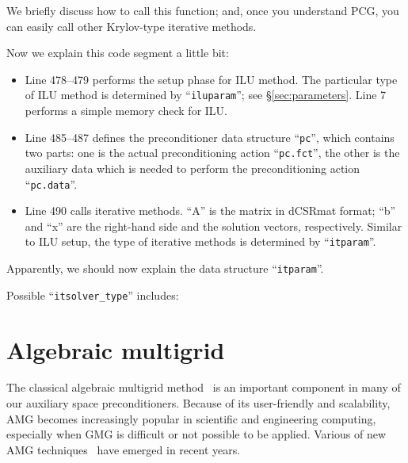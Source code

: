 \documentclass[11pt]{memoir}
\begin{document}
We briefly discuss how to call this function; and, once you understand PCG, you can easily call other Krylov-type iterative methods.
%

%
Now we explain this code segment a little bit:
\begin{itemize}
\item Line 478--479 performs the setup phase for ILU method. The particular type of ILU method is determined by ``\verb|iluparam|''; see \S\ref{sec:parameters}. Line 7 performs a simple memory check for ILU.
\item Line 485--487 defines the preconditioner data structure ``\verb|pc|'', which contains two parts: one is the actual preconditioning action ``\verb|pc.fct|'', the other is the auxiliary data which is needed to perform the preconditioning action ``\verb|pc.data|''.
\item Line 490 calls iterative methods. ``A'' is the matrix in dCSRmat format; ``b'' and ``x'' are the right-hand side and the solution vectors, respectively. Similar to ILU setup, the type of iterative methods is determined by ``\verb|itparam|''.
\end{itemize}

Apparently, we should now explain the data structure ``\verb|itparam|''.
%

%
Possible ``\verb|itsolver_type|'' includes:
%

%

\section{Algebraic multigrid}\label{sec:amg}

The classical algebraic multigrid method~\cite{Ruge.RugeStuben.1987bs} is an important component in many of our auxiliary space preconditioners. Because of its user-friendly and scalability, AMG becomes increasingly popular in scientific and engineering computing, especially when GMG is difficult or not possible to be applied. Various of new AMG techniques~\cite{Vanek.VanekMandel.1996kl,Wan.WanChan.2000qa,Brezina.BrezinaCleary.2000ly,Henson.HensonVassilevski.2001cr,Chartier.ChartierFalgout.2003ve,Livne.Livne.2004kl,Falgout.FalgoutVassilevski.2004bh,Xu.XuZikatanov.2004pi,Brannick.BrannickZikatanov.2007zr,Muresan.MuresanNotay.2008tg, Hu.X;Vassilevski.P;Xu.J.2013a} have emerged in recent years.
\end{document}
